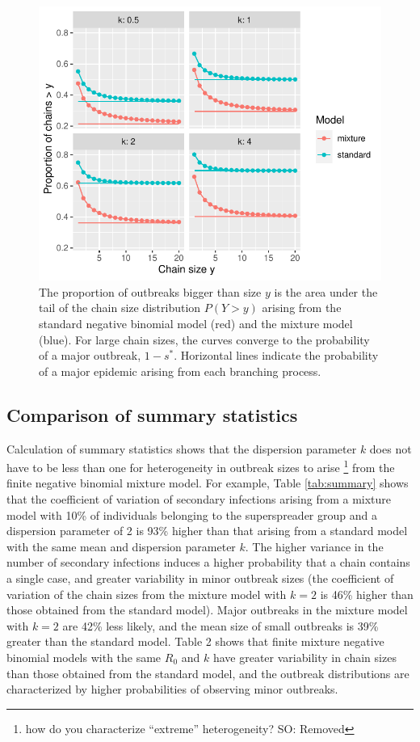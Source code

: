 \documentclass{imammb}
\numberwithin{equation}{section}
\begin{document}
\begin{figure}
    \centering
    \includegraphics{Figure3.pdf}
    \caption{The proportion of outbreaks bigger than size $y$ is the area under the tail of the chain size distribution $P(Y>y)$ arising from the standard negative binomial model (red) and the mixture model (blue). For large chain sizes, the curves converge to the probability of a major outbreak, $1-s^*$. Horizontal lines indicate the probability of a major epidemic arising from each branching process.}
    \label{fig:compcdf}
\end{figure}

\subsection{Comparison of summary statistics}

Calculation of summary statistics shows that the dispersion parameter $k$ does not have to be less than one for heterogeneity in outbreak sizes to arise \footnote{how do you characterize ``extreme'' heterogeneity? SO: Removed} from the finite negative binomial mixture model. For example, Table \ref{tab:summary} shows that the coefficient of variation of secondary infections arising from a mixture model with 10\% of individuals belonging to the superspreader group and a dispersion parameter of 2 is 93\% higher than that arising from a standard model with  the same mean and dispersion parameter $k$. The higher variance in the number of secondary infections induces a higher probability that a chain contains a single case, and greater variability in minor outbreak sizes (the coefficient of variation of the chain sizes from the mixture model with $k=2$ is 46\% higher than those obtained from the standard model). Major outbreaks in the mixture model with $k=2$ are 42\% less likely, and the mean size of small outbreaks is 39\% greater than the standard model. Table 2 shows that finite mixture negative binomial models with the same $R_0$ and $k$ have greater variability in chain sizes than those obtained from the standard model, and the outbreak distributions are characterized by higher probabilities of observing minor outbreaks. %
\end{document}
